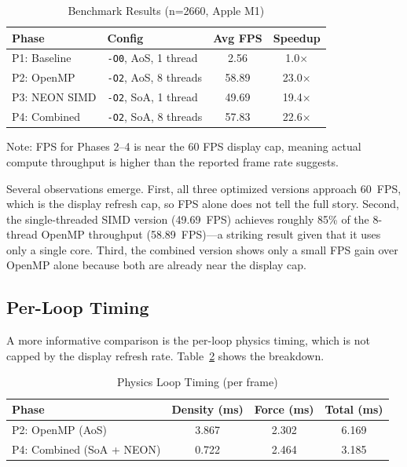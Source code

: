 \documentclass[12pt, a4paper]{article}
\begin{document}
\begin{table}[h]
\centering
\caption{Benchmark Results (n=2660, Apple M1)}
\label{tab:results}
\begin{tabular}{@{}llcc@{}}
\toprule
\textbf{Phase} & \textbf{Config} & \textbf{Avg FPS} & \textbf{Speedup} \\ \midrule
P1: Baseline     & \texttt{-O0}, AoS, 1 thread     & 2.56   & 1.0$\times$  \\
P2: OpenMP       & \texttt{-O2}, AoS, 8 threads    & 58.89  & 23.0$\times$ \\
P3: NEON SIMD    & \texttt{-O2}, SoA, 1 thread     & 49.69  & 19.4$\times$ \\
P4: Combined     & \texttt{-O2}, SoA, 8 threads    & 57.83  & 22.6$\times$ \\ \bottomrule
\end{tabular}
\vspace{2mm}
\footnotesize{Note: FPS for Phases 2--4 is near the 60 FPS display cap, meaning actual compute throughput is higher than the reported frame rate suggests.}
\end{table}

Several observations emerge. First, all three optimized versions approach 60~FPS, which is the display refresh cap, so FPS alone does not tell the full story. Second, the single-threaded SIMD version (49.69~FPS) achieves roughly 85\% of the 8-thread OpenMP throughput (58.89~FPS)---a striking result given that it uses only a single core. Third, the combined version shows only a small FPS gain over OpenMP alone because both are already near the display cap.

\subsection{Per-Loop Timing}
A more informative comparison is the per-loop physics timing, which is not capped by the display refresh rate. Table~\ref{tab:timings} shows the breakdown.

\begin{table}[h]
\centering
\caption{Physics Loop Timing (per frame)}
\label{tab:timings}
\begin{tabular}{@{}lccc@{}}
\toprule
\textbf{Phase} & \textbf{Density (ms)} & \textbf{Force (ms)} & \textbf{Total (ms)} \\ \midrule
P2: OpenMP (AoS)          & 3.867  & 2.302  & 6.169  \\
P4: Combined (SoA + NEON) & 0.722  & 2.464  & 3.185  \\ \bottomrule
\end{tabular}
\end{table}
\end{document}
